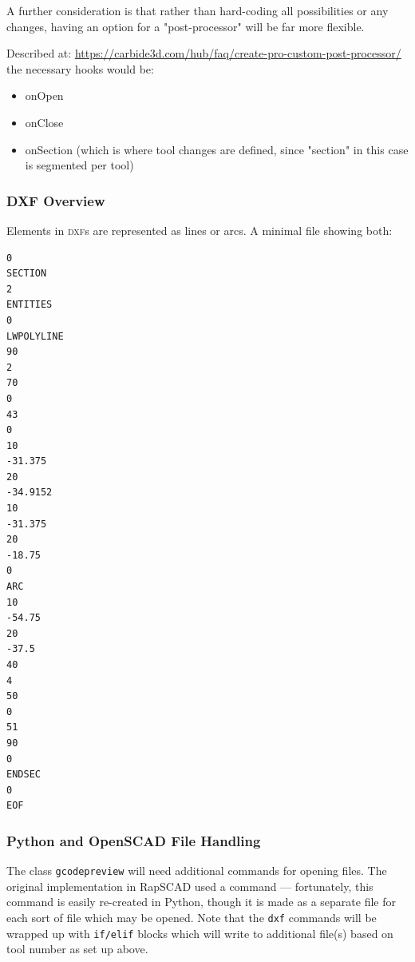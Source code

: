 \documentclass{ltxdoc}
\begin{document}
A further consideration is that rather than hard-coding all possibilities or any changes, having an option for a "post-processor" will be far more flexible.

Described at: \url{https://carbide3d.com/hub/faq/create-pro-custom-post-processor/} the necessary hooks would be:

\begin{itemize}
\item onOpen
\item onClose
\item onSection (which is where tool changes are defined, since "section" in this case is segmented per tool)
\end{itemize}

\subsubsection{DXF Overview}

Elements in \textsc{dxf}s are represented as lines or arcs. A minimal file showing both:

\begin{verbatim}
0
SECTION
2
ENTITIES
0
LWPOLYLINE
90
2
70
0
43
0
10
-31.375
20
-34.9152
10
-31.375
20
-18.75
0
ARC
10
-54.75
20
-37.5
40
4
50
0
51
90
0
ENDSEC
0
EOF
\end{verbatim}

\subsubsection{Python and OpenSCAD File Handling}

The class \verb|gcodepreview| will need additional commands for opening files. The original implementation in {RapSCAD} used a command  --- fortunately, this command is easily re-created in Python, though it is made as a separate file for each sort of file which may be opened. Note that the \verb|dxf| commands will be wrapped up with \verb|if/elif| blocks which will write to additional file(s) based on tool number as set up above.
\end{document}
